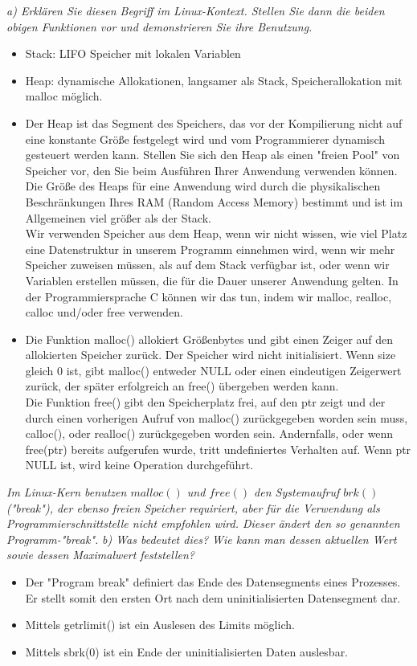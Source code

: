 \documentclass[a4paper]{article}
\begin{document}
\textit{a) Erklären Sie diesen Begriff im Linux-Kontext. Stellen Sie dann die beiden obigen Funktionen vor und demonstrieren Sie ihre Benutzung.}
\vspace{10mm}
\begin{itemize}
    \item Stack: LIFO Speicher mit lokalen Variablen
    \item Heap: dynamische Allokationen, langsamer als Stack, Speicherallokation mit malloc möglich.
    \item Der Heap ist das Segment des Speichers, das vor der Kompilierung nicht auf eine konstante Größe festgelegt wird und vom Programmierer dynamisch gesteuert werden kann. Stellen Sie sich den Heap als einen "freien Pool" von Speicher vor, den Sie beim Ausführen Ihrer Anwendung verwenden können. Die Größe des Heaps für eine Anwendung wird durch die physikalischen Beschränkungen Ihres RAM (Random Access Memory) bestimmt und ist im Allgemeinen viel größer als der Stack.\\
          Wir verwenden Speicher aus dem Heap, wenn wir nicht wissen, wie viel Platz eine Datenstruktur in unserem Programm einnehmen wird, wenn wir mehr Speicher zuweisen müssen, als auf dem Stack verfügbar ist, oder wenn wir Variablen erstellen müssen, die für die Dauer unserer Anwendung gelten. In der Programmiersprache C können wir das tun, indem wir malloc, realloc, calloc und/oder free verwenden.
    \item Die Funktion malloc() allokiert Größenbytes und gibt einen Zeiger auf den allokierten Speicher zurück.  Der Speicher wird nicht initialisiert.  Wenn size gleich 0 ist, gibt malloc() entweder NULL oder einen eindeutigen Zeigerwert zurück, der später erfolgreich an free() übergeben werden kann. \\
          Die Funktion free() gibt den Speicherplatz frei, auf den ptr zeigt und der durch einen vorherigen Aufruf von malloc() zurückgegeben worden sein muss,
          calloc(), oder realloc() zurückgegeben worden sein.  Andernfalls, oder wenn free(ptr) bereits aufgerufen wurde, tritt undefiniertes Verhalten auf.  Wenn ptr NULL ist, wird keine Operation durchgeführt.
\end{itemize}

\textit{Im Linux-Kern benutzen $malloc()$ und $free()$ den Systemaufruf $brk()$ ("break"), der ebenso freien Speicher requiriert, aber für die Verwendung als Programmierschnittstelle nicht empfohlen wird. Dieser ändert den so genannten Programm-"break".}
\vspace{10mm}
\textit{b) Was bedeutet dies? Wie kann man dessen aktuellen Wert sowie dessen Maximalwert feststellen?}
\vspace{10mm}
\begin{itemize}
	\item Der "Program break" definiert das Ende des Datensegments eines Prozesses. Er stellt somit den ersten Ort nach dem uninitialisierten Datensegment dar.
	\item Mittels getrlimit() ist ein Auslesen des Limits möglich.
	\item Mittels sbrk(0) ist ein Ende der uninitialisierten Daten auslesbar.
\end{itemize}
\end{document}
